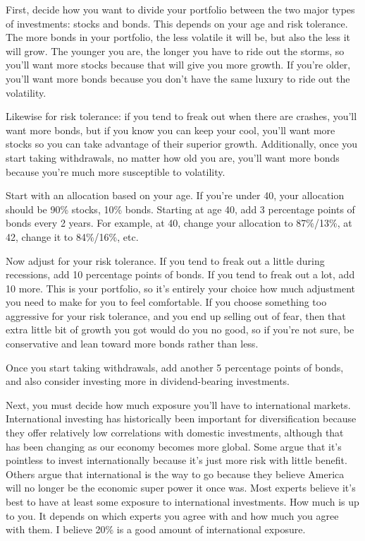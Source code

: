 First, decide how you want to divide your portfolio between the two major types of investments: stocks and bonds. This depends on your age and risk tolerance. The more bonds in your portfolio, the less volatile it will be, but also the less it will grow. The younger you are, the longer you have to ride out the storms, so you'll want more stocks because that will give you more growth. If you're older, you'll want more bonds because you don't have the same luxury to ride out the volatility.

Likewise for risk tolerance: if you tend to freak out when there are crashes, you'll want more bonds, but if you know you can keep your cool, you'll want more stocks so you can take advantage of their superior growth. Additionally, once you start taking withdrawals, no matter how old you are, you'll want more bonds because you're much more susceptible to volatility.

Start with an allocation based on your age. If you're under 40, your allocation should be 90\% stocks, 10\% bonds. Starting at age 40, add 3 percentage points of bonds every 2 years. For example, at 40, change your allocation to 87\%/13\%, at 42, change it to 84\%/16\%, etc.

Now adjust for your risk tolerance. If you tend to freak out a little during recessions, add 10 percentage points of bonds. If you tend to freak out a lot, add 10 more. This is your portfolio, so it's entirely your choice how much adjustment you need to make for you to feel comfortable. If you choose something too aggressive for your risk tolerance, and you end up selling out of fear, then that extra little bit of growth you got would do you no good, so if you're not sure, be conservative and lean toward more bonds rather than less.

Once you start taking withdrawals, add another 5 percentage points of bonds, and also consider investing more in dividend-bearing investments.

Next, you must decide how much exposure you'll have to international markets. International investing has historically been important for diversification because they offer relatively low correlations with domestic investments, although that has been changing as our economy becomes more global. Some argue that it's pointless to invest internationally because it's just more risk with little benefit. Others argue that international is the way to go because they believe America will no longer be the economic super power it once was. Most experts believe it's best to have at least some exposure to international investments. How much is up to you. It depends on which experts you agree with and how much you agree with them. I believe 20\% is a good amount of international exposure.

